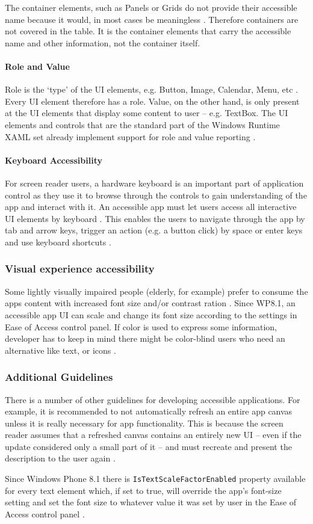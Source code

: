 The container elements, such as Panels or Grids do not provide their accessible name because it would, in most cases be meaningless \cite{wp8guide}. Therefore containers are not covered in the table.
It is the container elements that carry the accessible name and other information, not the container itself.

\paragraph{Role and Value}
Role is the ‘type’ of the UI elements, e.g. Button, Image, Calendar, Menu, etc \cite{wp8UIelementsAcc}. Every UI element therefore has a role. Value, on the other hand, is only present at the UI elements that display some content to user – e.g. TextBox. The UI elements and controls that are the standard part of the Windows Runtime XAML set already implement support for role and value reporting \cite{wp8UIelementsAcc}.

\paragraph{Keyboard Accessibility}
For screen reader users, a hardware keyboard is an important part of application control as they use it to browse through the controls to gain understanding of the app and interact with it. An accessible app must let users access all interactive UI elements by keyboard \cite{wp8guide}. This enables the users to navigate through the app by tab and arrow keys, trigger an action (e.g. a button click) by space or enter keys and use keyboard shortcuts \cite{wp8guide}.

\subsubsection{Visual experience accessibility}
Some lightly visually impaired people (elderly, for example) prefer to consume the apps content with increased font size and/or contrast ration \cite{wp8guide}. Since WP8.1, an accessible app UI can scale and change its font size according to the settings in Ease of Access control panel. If color is used to express some information, developer has to keep in mind there might be color-blind users who need an alternative like text, or icons \cite{wp8guide}.

\subsubsection{Additional Guidelines}
There is a number of other guidelines for developing accessible applications. For example, it is recommended to not automatically refresh an entire app canvas unless it is really necessary for app functionality. This is because the screen reader assumes that a refreshed canvas contains an entirely new UI – even if the update considered only a small part of it – and must recreate and present the description to the user again \cite{wp8guide}.

Since Windows Phone 8.1 there is \texttt{IsTextScaleFactorEnabled} property available for every text element which, if set to true, will override the app's font-size setting and set the font size to whatever value it was set by user in the Ease of Access control panel \cite{wp8guide}.


